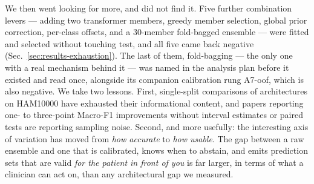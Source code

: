 \documentclass[journal]{IEEEtran}
\begin{document}
We then went looking for more, and did not find it. Five further combination levers --- adding
two transformer members, greedy member selection, global prior correction, per-class offsets,
and a $30$-member fold-bagged ensemble --- were fitted and selected without touching test, and
all five came back negative (Sec.~\ref{sec:results-exhaustion}). The last of them,
fold-bagging --- the only one with a real mechanism behind it --- was named in the analysis
plan before it existed and read once, alongside its companion calibration rung A7-oof, which
is also negative. We take
two lessons. First, single-split comparisons of architectures on HAM10000 have exhausted their
informational content, and papers reporting one- to three-point Macro-F1 improvements without
interval estimates or paired tests are reporting sampling noise. Second, and more usefully:
the interesting axis of variation has moved from \emph{how accurate} to \emph{how usable}. The
gap between a raw ensemble and one that is calibrated, knows when to abstain, and emits
prediction sets that are valid \emph{for the patient in front of you} is far larger, in terms
of what a clinician can act on, than any architectural gap we measured.


\clearpage
\onecolumn

\end{document}
